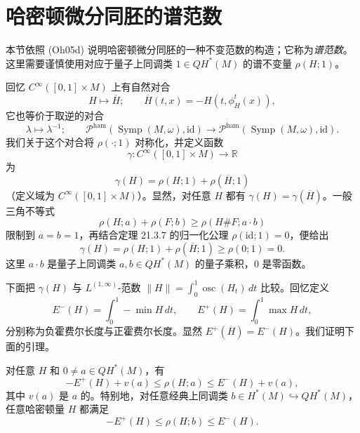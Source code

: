 \section{哈密顿微分同胚的谱范数}
\label{sec:spectral-norm-hamiltonian-diffeomorphisms}

本节依照 (Oh05d) 说明哈密顿微分同胚的一种不变范数的构造；它称为\emph{谱范数}。
这里需要谨慎使用对应于量子上同调类 $1\in QH^*(M)$ 的谱不变量 $\rho(H;1)$。

回忆 $C^\infty([0,1]\times M)$ 上有自然对合
\[
 H\longmapsto\overline H;\qquad
 \overline H(t,x)=-H(t,\phi_H^t(x)),
\]
它也等价于取逆的对合
\[
 \lambda\longmapsto\lambda^{-1};\qquad
 \mathcal P^{\mathrm{ham}}(\operatorname{Symp}(M,\omega),\mathrm{id})
 \longrightarrow
 \mathcal P^{\mathrm{ham}}(\operatorname{Symp}(M,\omega),\mathrm{id}).
\]
我们关于这个对合将 $\rho(\mathord\cdot;1)$ 对称化，并定义函数
\[
 \gamma:C^\infty([0,1]\times M)\longrightarrow\mathbb R
\]
为
\begin{equation}
 \gamma(H)=\rho(H;1)+\rho(\overline H;1)
 \label{eq:22-gamma-hamiltonian}
\end{equation}
（定义域为 $C^\infty([0,1]\times M)$）。显然，对任意 $H$ 都有
$\gamma(H)=\gamma(\overline H)$。一般三角不等式
\[
 \rho(H;a)+\rho(F;b)\geq\rho(H\#F;a\cdot b)
\]
限制到 $a=b=1$，再结合定理 21.3.7 的归一化公理 $\rho(\mathrm{id};1)=0$，便给出
\begin{equation}
 \gamma(H)=\rho(H;1)+\rho(\overline H;1)\geq\rho(0;1)=0.
 \label{eq:22-gamma-nonnegative}
\end{equation}
这里 $a\cdot b$ 是量子上同调类 $a,b\in QH^*(M)$ 的量子乘积，$0$ 是零函数。

下面把 $\gamma(H)$ 与 $L^{(1,\infty)}$-范数
$\lVert H\rVert=\int_0^1\operatorname{osc}(H_t)\,dt$ 比较。回忆定义
\begin{equation}
 E^-(H)=\int_0^1-\min H\,dt,
 \qquad
 E^+(H)=\int_0^1\max H\,dt,
 \label{eq:22-hofer-lengths}
\end{equation}
分别称为负霍费尔长度与正霍费尔长度。显然
$E^+(\overline H)=E^-(H)$。我们证明下面的引理。

\begin{lemma}
\label{lem:22-spectral-hofer-bounds}
对任意 $H$ 和 $0\neq a\in QH^*(M)$，有
\begin{equation}
 -E^+(H)+v(a)\leq\rho(H;a)\leq E^-(H)+v(a),
 \label{eq:22-spectral-valuation-bounds}
\end{equation}
其中 $v(a)$ 是 $a$ 的\termValuation{}。特别地，对任意经典上同调类
$b\in H^*(M)\hookrightarrow QH^*(M)$，任意哈密顿量 $H$ 都满足
\begin{equation}
 -E^+(H)\leq\rho(H;b)\leq E^-(H).
 \label{eq:22-classical-hofer-bounds}
\end{equation}
\end{lemma}

